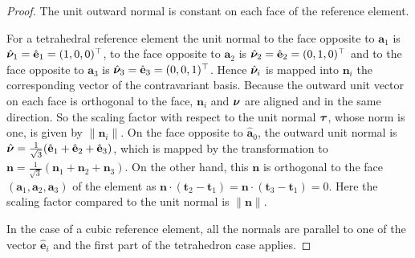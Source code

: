 \begin{proof}
The unit outward normal is constant on each face of the reference element. 

For a tetrahedral reference element the unit normal to the face opposite to $ \mathbf{a}_1$ is $ \hat{\boldsymbol{\nu}}_1= \hat{\mathbf{e}}_1=(1,0,0)^\top $,   to the face opposite to $ \mathbf{a}_2$ is $ \hat{\boldsymbol{\nu}}_2 = \hat{\mathbf{e}}_2=(0,1,0)^\top$ and to the face opposite to $ \mathbf{a}_3$ is $ \hat{\boldsymbol{\nu}}_3=\hat{\mathbf{e}}_3=(0,0,1)^\top$. Hence $ \hat{\boldsymbol{\nu}}_i$ is mapped into $ \mathbf{n}_i$ the corresponding vector of the contravariant basis. Because the outward unit vector on each face is orthogonal to the face, $ \mathbf{n}_i$ and $\boldsymbol{\nu}$ are aligned and in the same direction. So the scaling factor with respect to the unit normal $ \boldsymbol{\tau}$, whose norm is one, is given by $ \|\mathbf{n}_i\|$.
On the face opposite to  $ \hat{\mathbf{a}}_0$, the outward unit normal is $ \hat{\boldsymbol{\nu}} = \frac{1}{\sqrt{3}}( \hat{\mathbf{e}}_1 + \hat{\mathbf{e}}_2 + \hat{\mathbf{e}}_3)$, which is mapped by the transformation to $ \mathbf{n} = \frac{1}{\sqrt{3}}(
\mathbf{n}_1 + \mathbf{n}_2 + \mathbf{n}_3)$. On the other hand, this $ \mathbf{n} $ is orthogonal to the face 
$ (\mathbf{a}_1,\mathbf{a}_2,\mathbf{a}_3)$ of the element as $ \mathbf{n}\cdot ( \mathbf{t}_2- \mathbf{t}_1)
= \mathbf{n}\cdot ( \mathbf{t}_3- \mathbf{t}_1)=0$. Here the scaling factor compared to the unit normal is $\| \mathbf{n}\|$.

In the case of a cubic reference element, all the normals are parallel to one of the vector $ \hat{\mathbf{e}}_i$ and the first part of the tetrahedron case applies.

\end{proof}


